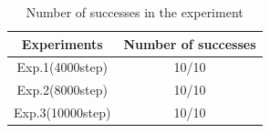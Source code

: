



\vspace{10mm}
\begin{table}[h]
  \centering
  \begin{tabular}{|c|c|} \hline
    Experiments & Number of successes \\ \hline
    Exp.1(4000step) & 10/10 \\ \hline
    Exp.2(8000step) & 10/10 \\ \hline
    Exp.3(10000step) & 10/10 \\ \hline
  \end{tabular}
  \caption{Number of successes in the experiment}
  \label{tb:exp2.2}
\end{table}

